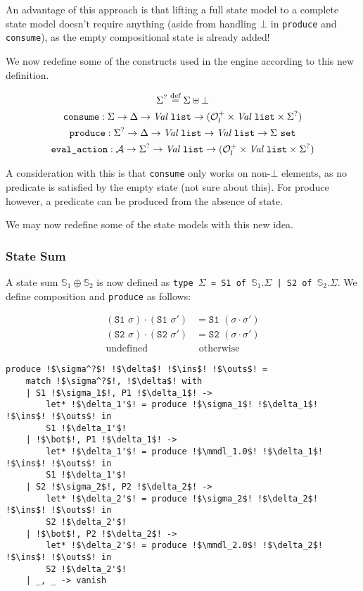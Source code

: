 \documentclass[,a4paper,oneside]{article}
\newcommand{\code}[1]{\texttt{#1}}
\newcommand{\defeq}{\stackrel{\text{def}}=}
\newcommand{\mmdl}{\ensuremath{\mathbb S}}
\newcommand{\rarr}{\ensuremath{\rightarrow}}
\begin{document}
An advantage of this approach is that lifting a full state model to a complete state model doesn't require anything (aside from handling $\bot$ in \code{produce} and \code{consume}), as the empty compositional state is already added!

We now redefine some of the constructs used in the engine according to this new definition.

\newcommand{\vallist}[0]{\textit{Val}~\code{list}}

\begin{gather*}
	\Sigma^? \defeq \Sigma \uplus \bot\\
	\code{consume}:\Sigma \rarr \Delta \rarr \vallist \rarr (\mathcal O^+_l \times \vallist \times \Sigma^?) \\
	\code{produce}:\Sigma^? \rarr \Delta \rarr \vallist \rarr \vallist \rarr \Sigma~\code{set}\\
	\code{eval\_action}: {\cal A} \rarr \Sigma^? \rarr \vallist \rarr (\mathcal O^+_l \times \vallist \times \Sigma^?)
\end{gather*}

A consideration with this is that \code{consume} only works on non-$\bot$ elements, as no predicate is satisfied by the empty state (not sure about this). For produce however, a predicate can be produced from the absence of state.

We may now redefine some of the state models with this new idea.

\subsubsection{State Sum}

A state sum $\mathbb S_1 \oplus \mathbb S_2$ is now defined as \code{type $\Sigma$ = S1 of $\mathbb S_1.\Sigma$ | S2 of $\mathbb S_2.\Sigma$}. We define composition and \code{produce} as follows:

\begin{align*}
	(\code{S1 }\sigma)\cdot(\code{S1 }\sigma') &= \code{S1 }(\sigma\cdot\sigma')\\
	(\code{S2 }\sigma)\cdot(\code{S2 }\sigma') &= \code{S2 }(\sigma\cdot\sigma')\\
	\text{undefined}&\text{ otherwise}
\end{align*}

\begin{verbatim}
produce !$\sigma^?$! !$\delta$! !$\ins$! !$\outs$! =
    match !$\sigma^?$!, !$\delta$! with
    | S1 !$\sigma_1$!, P1 !$\delta_1$! -> 
        let* !$\delta_1'$! = produce !$\sigma_1$! !$\delta_1$! !$\ins$! !$\outs$! in
        S1 !$\delta_1'$!
    | !$\bot$!, P1 !$\delta_1$! ->
    	let* !$\delta_1'$! = produce !$\mmdl_1.0$! !$\delta_1$! !$\ins$! !$\outs$! in
        S1 !$\delta_1'$!
    | S2 !$\sigma_2$!, P2 !$\delta_2$! -> 
        let* !$\delta_2'$! = produce !$\sigma_2$! !$\delta_2$! !$\ins$! !$\outs$! in
        S2 !$\delta_2'$!
    | !$\bot$!, P2 !$\delta_2$! -> 
        let* !$\delta_2'$! = produce !$\mmdl_2.0$! !$\delta_2$! !$\ins$! !$\outs$! in
        S2 !$\delta_2'$!
    | _, _ -> vanish
\end{verbatim}
\end{document}
